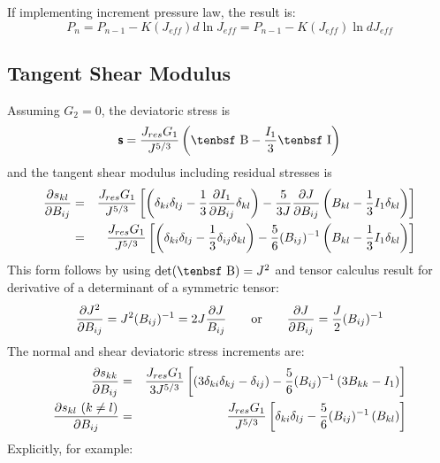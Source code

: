 \documentclass[11pt]{book}
\newcommand{\tens}[1]{\boldsymbol{\mathsf{#1}}}
\def\B{\hbox{\tenbsf B}}
\def\I{\hbox{\tenbsf I}}
\def\Jeff{J_{eff}}
\def\Jres{J_{res}}
\begin{document}
If implementing increment pressure law, the result is:
\begin{equation}
    P_{n} = P_{n-1}-K(\Jeff)d\ln\Jeff = P_{n-1}-K(\Jeff)\ln d\Jeff
\end{equation}

\subsection{Tangent Shear Modulus}

Assuming $G_2=0$, the deviatoric stress is
\begin{equation}
    \tens s = {\Jres G_1\over J^{5/3}}\left(\B - {I_1\over3}\I\right)
\end{equation}
and the tangent shear modulus including residual stresses is
\begin{eqnarray}
    {\partial s_{kl}\over\partial B_{ij}} & = &  
    {\Jres G_1\over J^{5/3}}\left[
                  \left(\delta_{ki}\delta_{lj}-{1\over3}{\partial I_1\over\partial B_{ij}}\delta_{kl}\right)
        -{5\over 3J}{\partial J\over \partial B_{ij}}\left(B_{kl}-{1\over3}I_1\delta_{kl}\right) \right] \\
        & = &  
    {\Jres G_1\over J^{5/3}}\left[
                  \left(\delta_{ki}\delta_{lj}-{1\over3}\delta_{ij}\delta_{kl}\right)
  -{5\over 6}(B_{ij})^{-1}\left(B_{kl}-{1\over3}I_1\delta_{kl}\right) \right]
\end{eqnarray}
This form follows by using $\det(\B )=J^2$ and tensor calculus result for derivative of a determinant of a symmetric tensor:
\begin{equation}
   {\partial J^2\over \partial B_{ij}} = J^2(B_{ij})^{-1} = 2J {\partial J\over B_{ij}}   \qquad{\rm or}\qquad {\partial J\over \partial B_{ij}} = {J\over 2}(B_{ij})^{-1}
\end{equation}
The normal and shear deviatoric stress increments are:
\begin{eqnarray}
    {\partial s_{kk}\over\partial B_{ij}} & = &  
    {\Jres G_1\over 3J^{5/3}}\left[
                 \left(3\delta_{ki}\delta_{kj}-\delta_{ij}\right)
  -{5\over 6}(B_{ij})^{-1}\left(3B_{kk}-I_1\right) \right]  \\
    {\partial s_{kl}\ (k\ne l)\over\partial B_{ij}} & = &  
    {\Jres G_1\over J^{5/3}}\left[   \delta_{ki}\delta_{lj} -{5\over 6}(B_{ij})^{-1}\left(B_{kl}\right) \right] 
\end{eqnarray}
Explicitly, for example:
\end{document}
